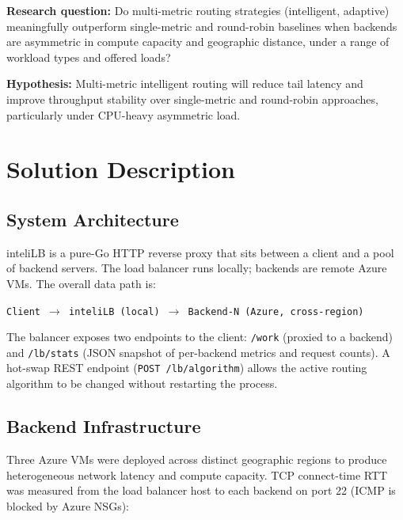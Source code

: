 \documentclass[12pt]{article}
\begin{document}
\textbf{Research question:} Do multi-metric routing strategies (intelligent,
adaptive) meaningfully outperform single-metric and round-robin baselines
when backends are asymmetric in compute capacity and geographic distance,
under a range of workload types and offered loads?

\textbf{Hypothesis:} Multi-metric intelligent routing will reduce tail latency
and improve throughput stability over single-metric and round-robin approaches,
particularly under CPU-heavy asymmetric load.

\section{Solution Description}

\subsection{System Architecture}

inteliLB is a pure-Go HTTP reverse proxy that sits between a client and a pool
of backend servers. The load balancer runs locally; backends are remote Azure
VMs. The overall data path is:

\begin{center}
\texttt{Client $\longrightarrow$ inteliLB (local) $\longrightarrow$
Backend-N (Azure, cross-region)}
\end{center}

The balancer exposes two endpoints to the client: \texttt{/work} (proxied to a
backend) and \texttt{/lb/stats} (JSON snapshot of per-backend metrics and
request counts). A hot-swap REST endpoint (\texttt{POST /lb/algorithm}) allows
the active routing algorithm to be changed without restarting the process.

\subsection{Backend Infrastructure}

Three Azure VMs were deployed across distinct geographic regions to produce
heterogeneous network latency and compute capacity. TCP connect-time RTT was
measured from the load balancer host to each backend on port 22 (ICMP is
blocked by Azure NSGs):
\end{document}
